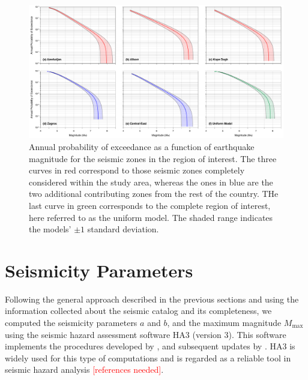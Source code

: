 
\begin{figure}[t]
    \centering
    \includegraphics[width=\textwidth]{figures/pdf/figure-06} 
    \caption{Annual probability of exceedance as a function of earthquake magnitude for the seismic zones in the region of interest. The three curves in red correspond to those seismic zones completely considered within the study area, whereas the ones in blue are the two additional contributing zones from the rest of the country. THe last curve in green corresponds to the complete region of interest, here referred to as the uniform model. The shaded range indicates the models' $\pm 1$ standard deviation.}
    \label{fig:annualp}
\end{figure}

\section{Seismicity Parameters}

Following the general approach described in the previous sections and using the information collected about the seismic catalog and its completeness, we computed the seismicity parameters $a$ and $b$, and the maximum magnitude $M_{\max}$ using the seismic hazard assessment software HA3 (version 3). This software implements the procedures developed by \citet{Kijko_1989_BSSA, Kijko_1992_BSSA}, and subsequent updates by \citet{Kijko_2004_PAG}. HA3 is widely used for this type of computations and is regarded as a reliable tool in seismic hazard analysis \citep[see, for instance,][]{}\textcolor{red}{[references needed]}.

